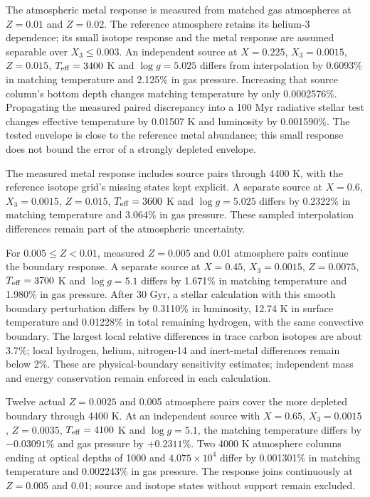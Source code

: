 \documentclass[11pt,letterpaper]{article}
\begin{document}
The atmospheric metal response is measured from matched gas atmospheres at
$Z=0.01$ and $Z=0.02$. The reference atmosphere retains its helium-3
dependence; its small isotope response and the metal response are assumed
separable over $X_3\leq0.003$. An independent source at $X=0.225$,
$X_3=0.0015$, $Z=0.015$, $T_{\rm eff}=3400$ K and $\log g=5.025$
differs from interpolation by 0.6093\% in matching temperature and 2.125\%
in gas pressure. Increasing that source column's bottom depth changes
matching temperature by only 0.0002576\%. Propagating the measured paired
discrepancy into a 100 Myr radiative stellar test changes effective temperature
by 0.01507 K and luminosity by 0.001590\%. The tested envelope is close to
the reference metal abundance; this small response does not bound the error
of a strongly depleted envelope.

The measured metal response includes source pairs through 4400 K,
with the reference isotope grid's missing states kept explicit. A separate
source at $X=0.6$, $X_3=0.0015$, $Z=0.015$, $T_{\rm eff}=3600$ K and
$\log g=5.025$ differs by 0.2322\% in matching temperature and 3.064\% in
gas pressure. These sampled interpolation differences remain part of the
atmospheric uncertainty.

For $0.005\leq Z<0.01$, measured $Z=0.005$ and 0.01 atmosphere pairs
continue the boundary response. A separate source at $X=0.45$,
$X_3=0.0015$, $Z=0.0075$, $T_{\rm eff}=3700$ K and $\log g=5.1$
differs by 1.671\% in matching temperature and 1.980\% in gas pressure.
After 30 Gyr, a stellar calculation with this smooth boundary perturbation
differs by 0.3110\% in luminosity, 12.74 K in surface temperature and
0.01228\% in total remaining hydrogen, with the same convective boundary.
The largest local relative differences in trace carbon isotopes are about
3.7\%; local hydrogen, helium, nitrogen-14 and inert-metal differences
remain below 2\%. These are physical-boundary sensitivity estimates;
independent mass and energy conservation remain enforced in each calculation.

Twelve actual $Z=0.0025$ and 0.005 atmosphere pairs cover the more depleted
boundary through 4400 K. At an independent source with $X=0.65$,
$X_3=0.0015$, $Z=0.0035$, $T_{\rm eff}=4100$ K and $\log g=5.1$,
the matching temperature differs by $-0.03091\%$ and gas pressure by
$+0.2311\%$. Two 4000 K atmosphere columns ending at optical depths of
1000 and $4.075\times10^4$ differ by 0.001301\% in matching temperature
and 0.002243\% in gas pressure. The response joins continuously at
$Z=0.005$ and 0.01; source and isotope states without support remain excluded.
\end{document}
